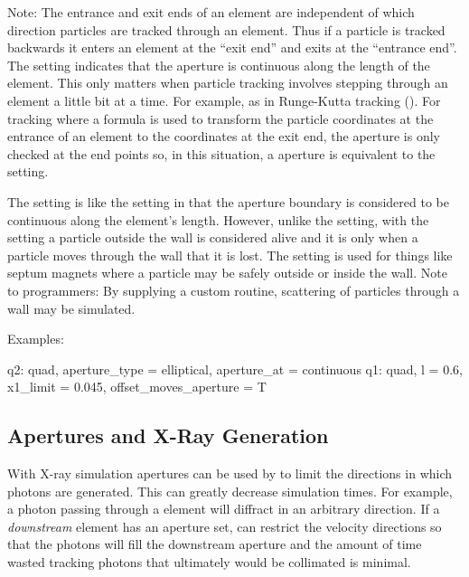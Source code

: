 Note: The entrance and exit ends of an element are independent of which direction particles are
tracked through an element. Thus if a particle is tracked backwards it enters an element at the
``exit end'' and exits at the ``entrance end''. The  setting indicates that the
aperture is continuous along the length of the element. This only matters when particle tracking
involves stepping through an element a little bit at a time. For example, as in Runge-Kutta tracking
(). For tracking where a formula is used to transform the particle coordinates at the
entrance of an element to the coordinates at the exit end, the aperture is only checked at the end
points so, in this situation, a  aperture is equivalent to the 
setting.

The  setting is like the  setting in that the aperture boundary
is considered to be continuous along the element's length. However, unlike the 
setting, with the  setting a particle outside the wall is considered alive and
it is only when a particle moves through the wall that it is lost.  The  setting
is used for things like septum magnets where a particle may be safely outside or inside the
wall. Note to programmers: By supplying a custom  routine, scattering of
particles through a wall may be simulated.

Examples:
\begin{example}
  q2: quad, aperture_type = elliptical, aperture_at = continuous
  q1: quad, l = 0.6, x1_limit = 0.045, offset_moves_aperture = T
\end{example}

\subsection{Apertures and X-Ray Generation}
\label{s:aper.x.ray}

With X-ray simulation apertures can be used by \bmad to limit the directions in which photons are
generated. This can greatly decrease simulation times. For example, a photon passing through a
 element will diffract in an arbitrary direction. If a {\em downstream}
element has an aperture set, \bmad can restrict the velocity directions so that the photons will
fill the downstream aperture and the amount of time wasted tracking photons that ultimately would be
collimated is minimal.

